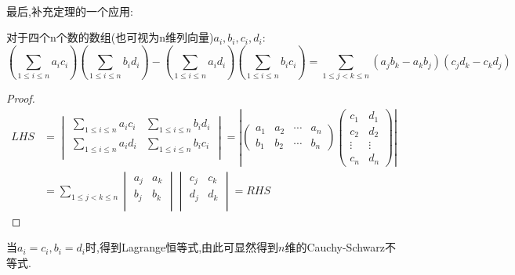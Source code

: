 \documentclass[UTF8,a4paper,notitlepage]{book}
\begin{document}
        \paragraph{}最后,补充定理的一个应用: 
        \begin{theorem}[Cauchy恒等式]
            对于四个n个数的数组(也可视为n维列向量)$a_i,b_i,c_i,d_i$:
            $$(\sum_{1\leq i\leq n} a_ic_i)(\sum_{1\leq i\leq n} b_id_i)-(\sum_{1\leq i\leq n} a_id_i)(\sum_{1\leq i\leq n} b_ic_i)=\sum_{1\leq j<k\leq n}(a_jb_k-a_kb_j)(c_jd_k-c_kd_j)$$
        \end{theorem}
        \begin{proof} 
            $$\begin{array}{ll}LHS
            &=\begin{vmatrix} \sum\limits_{1\leq i\leq n} a_ic_i &\sum\limits_{1\leq i\leq n} b_id_i \\ \sum\limits_{1\leq i\leq n} a_id_i & \sum\limits_{1\leq i\leq n} b_ic_i\\ \end{vmatrix}
            =\left|\begin{pmatrix}a_1 & a_2 & \cdots & a_n \\ b_1 & b_2 & \cdots & b_n\end{pmatrix}\begin{pmatrix}c_1 & d_1 \\ c_2 & d_2 \\ \vdots & \vdots \\ c_n & d_n \end{pmatrix}\right| \\ 
            &=\sum\limits_{1\leq j<k\leq n} \begin{vmatrix} a_j&a_k\\ b_j&b_k\\ \end{vmatrix}\begin{vmatrix} c_j&c_k\\ d_j&d_k\\ \end{vmatrix} 
            =RHS \end{array}$$
        \end{proof}
        当$a_i=c_i,b_i=d_i$时,得到Lagrange恒等式,由此可显然得到$n$维的Cauchy-Schwarz不等式.
\end{document}
